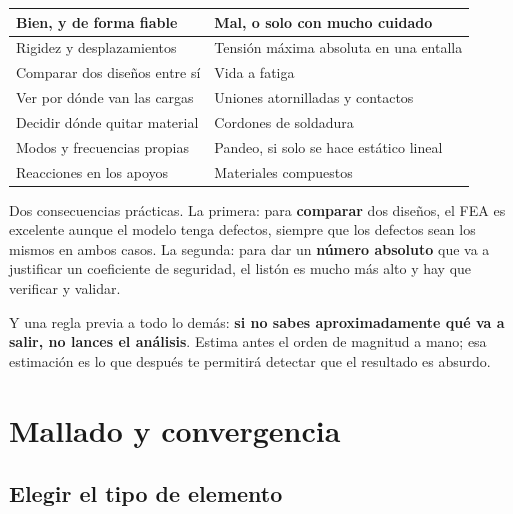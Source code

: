 \begin{center}
\begin{tabularx}{\textwidth}{@{}XX@{}}
\toprule
\textbf{Bien, y de forma fiable} & \textbf{Mal, o solo con mucho cuidado} \\
\midrule
Rigidez y desplazamientos & Tensión máxima absoluta en una entalla \\
Comparar dos diseños entre sí & Vida a fatiga \\
Ver por dónde van las cargas & Uniones atornilladas y contactos \\
Decidir dónde quitar material & Cordones de soldadura \\
Modos y frecuencias propias & Pandeo, si solo se hace estático lineal \\
Reacciones en los apoyos & Materiales compuestos \\
\bottomrule
\end{tabularx}
\end{center}

Dos consecuencias prácticas. La primera: para \textbf{comparar} dos diseños, el
FEA es excelente aunque el modelo tenga defectos, siempre que los defectos sean
los mismos en ambos casos. La segunda: para dar un \textbf{número absoluto} que
va a justificar un coeficiente de seguridad, el listón es mucho más alto y hay
que verificar y validar.

Y una regla previa a todo lo demás: \textbf{si no sabes aproximadamente qué va a
salir, no lances el análisis}. Estima antes el orden de magnitud a mano; esa
estimación es lo que después te permitirá detectar que el resultado es absurdo.

\section{Mallado y convergencia}
\label{sec:elementos_finitos:02}

\subsection{Elegir el tipo de elemento}

